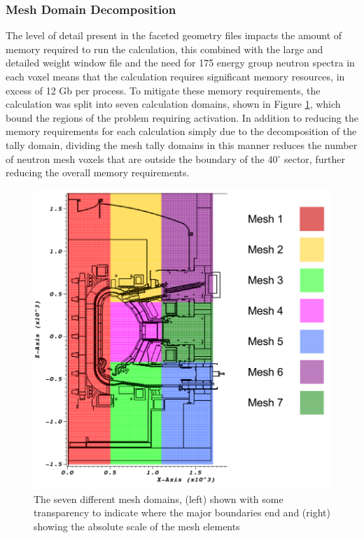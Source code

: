 \documentclass[12pt]{article}
\begin{document}
\subsubsection{Mesh Domain Decomposition}
The level of detail present in the faceted geometry files impacts the amount of
memory required to run the calculation, this combined with the large and
detailed weight window file and the need for 175 energy group neutron spectra
in each voxel means that the calculation requires significant memory resources,
in excess of 12 Gb per process.  %
To mitigate these memory requirements, the calculation was split into seven 
calculation domains, shown in Figure
\ref{fig:mesh_domains}, which bound the regions of the problem requiring
activation. In addition to reducing the memory requirements for each calculation
simply due to the decomposition of the tally domain, dividing the mesh tally 
domains in this manner reduces the number of neutron mesh voxels that are 
outside the boundary of the 40$^{\circ}$ sector, further reducing the overall memory
requirements.

\begin{figure}[ht!]
  \centering
  \includegraphics[scale=0.4]{../plots/transport/job_splits.png}
  \caption{The seven different mesh domains, (left) shown with some transparency
           to indicate where the major boundaries end and (right) showing the
           absolute scale of the mesh elements}
  \label{fig:mesh_domains}
\end{figure}
\end{document}
